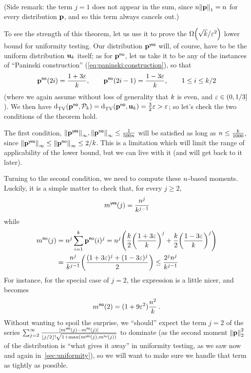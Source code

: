\noindent (Side remark: the term $j=1$ does not appear in the sum, since $\ns\norm{\p}_1=\ns$ for every distribution $\mathbf{p}$, and so this term always cancels out.)\medskip

To see the strength of this theorem, let us use it to prove the $\bigOmega{\sqrt{\ab}/\dst^2}$ lower bound for uniformity testing. Our distribution $\mathbf{p}^{\sf{}yes}$ will, of course, have to be the uniform distribution $\mathbf{u}_k$ itself; as for $\mathbf{p}^{{\sf{}no}}$, let us take it to be any of the instances of ``Paninski construction'' (\cref{eq:paninski:construction}), so that
\[
	\mathbf{p}^{{\sf{}no}}(2i) = \frac{1+3\varepsilon}{k}, \qquad \mathbf{p}^{{\sf{}no}}(2i-1) = \frac{1-3\varepsilon}{k}, \qquad 1\leq i\leq k/2
\]
(where we again assume without loss of generality that $k$ is even, and $\varepsilon\in(0,1/3]$). We then have 
$\totalvardist{\p^\no}{\property_\ab}=\totalvardist{\p^\no}{\uniform_\ab}= \frac{3}{2}\dst > \dst$; so let's check the two conditions of the theorem hold. 

The first condition, 
$\norminf{\p^\yes},\norminf{\p^\no} \leq \frac{1}{500\ns}$
will be satisfied as long as $n \leq \frac{k}{1000}$, since $\norminf{\p^\yes}\leq \norminf{\p^\no} \leq 2/\ab$. This is a limitation which will limit the range of applicability of the lower bound, but we can live with it (and will get back to it later).

Turning to the second condition, we need to compute these $n$-based moments. Luckily, it is a simple matter to check that, for every $j\geq 2$,
\begin{equation}
	\label{eq:moments:yes}
	m^{{\sf{}yes}}(j) = \frac{n^j}{k^{j-1}}
\end{equation}
while
\begin{align}
	m^{\no}(j) 
	&= \ns^j \sum_{i=1}^\ab \p^{\no}(i)^j 
	= \ns^j\Paren{ \frac{\ab}{2} \Paren{\frac{1+3\dst}{\ab}}^j + \frac{\ab}{2} \Paren{\frac{1-3\dst}{\ab}}^j } \notag\\
	&= \frac{\ns^j}{\ab^{j-1}}\Paren{ \frac{(1+3\dst)^j + (1-3\dst)^j}{2} }
	\leq \frac{2^j\ns^j}{\ab^{j-1}} \label{eq:moments:no}
\end{align}
For instance, for the special case of $j=2$, the expression is a little nicer, and becomes
\begin{equation}
	m^{{\sf{}no}}(2)
	= (1+9\varepsilon^2)\frac{n^2}{k}\,.
\end{equation}
Without wanting to spoil the surprise, we ``should'' expect the term $j=2$ of the series $\sum_{j=2}^\infty \frac{\abs{m^{\yes}(j)-m^{\no}(j)}}{\flr{j/2}!\sqrt{1+\max(m^{\yes}(j),m^{\no}(j))}}$ to dominate (as the second moment $\normtwo{\p}^2$ of the distribution is ``what gives it away'' in uniformity testing, as we saw now and again in~\cref{sec:uniformity}), so we will want to make sure we handle that term as tightly as possible.\medskip

